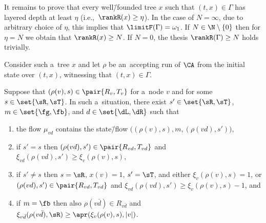 \documentclass{lmcs}
\numberwithin{equation}{section}
\numberwithin{figure}{section}
\begin{document}
It remains to prove that every well\=/founded tree $x$ such that $(t,x)\in\Gamma$ has layered depth at least $\eta$ (i.e.,~$\rankR(x)\geq \eta$).
In the case of $N=\infty$, due to arbitrary choice of $\eta$, this implies that $\limitF(\Gamma)=\omega_1$.
If $N\in\N\setminus\{0\}$ then for $\eta=N$ we obtain that $\rankR(x)\geq N$.
If $N=0$, the thesis $\rankR(\Gamma)\geq N$ holds trivially.

Consider such a~tree $x$ and let $\rho$ be an~accepting run of $\CA$ from the initial state over $(t,x)$, witnessing that $(t,x)\in\Gamma$.

\begin{clm}\label{claim:go-down}
	Suppose that $(\rho(v),s)\in\pair{R_v,T_v}$ for a~node $v$ and for some $s\in\set{\sR,\sT}$.
	In such a~situation, there exist $s'\in\set{\sR,\sT}$, $m\in\set{\fg,\fb}$, and $d\in\set{\dL,\dR}$ such that
	\begin{enumerate}
	\item	the flow $\mu_{vd}$ contains the state\=/flow $\big((\rho(v),s),m,(\rho(vd),s')\big)$,
		\label{it:down-flow}
	\item	if $s' = s$ then $(\rho(vd),s')\in\pair{R_{vd},T_{vd}}$ and $\xi_{vd}(\rho(vd),s')\geq\xi_v(\rho(v),s)$,
		\label{it:down-eq}
	\item	if $s'\neq s$ then $s=\sR$, $x(v)=1$, $s'=\sT$, and either $\xi_v(\rho(v),s)=1$, or $(\rho(vd),s')\in\pair{R_{vd},T_{vd}}$ and $\xi_{vd}(\rho(vd),s')\geq\xi_v(\rho(v),s)-1$, and
		\label{it:down-neq}
	\item	if $m=\fb$ then also $\rho(v\bar{d})\in R_{v\bar{d}}$ and $\xi_{v\bar{d}}(\rho(v\bar{d}),\sR)\geq\apr(\xi_v(\rho(v),s),|v|)$.
		\label{it:down-two}
	\end{enumerate}
\end{clm}
\end{document}
